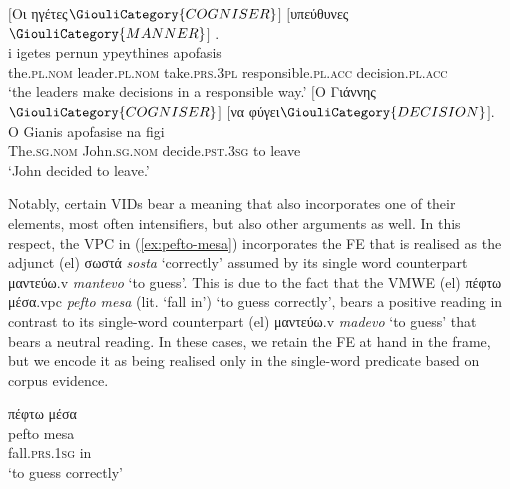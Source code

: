 \documentclass[output=paper,colorlinks,citecolor=brown]{langscibook}
\begin{document}
\ea
\label{ex:perno-apofasi}
\glll
$[$Οι ηγέτες$\GiouliCategory{COGNISER}$$]$ {} $[$υπεύθυνες$\GiouliCategory{MANNER}$$]$ {}. \\
i igetes pernun ypeythines apofasis \\
the.\textsc{pl.nom} leader.\textsc{pl.nom} take.\textsc{prs.3pl} responsible.\textsc{pl.acc} decision.\textsc{pl.acc} \\
\glt ‘the leaders make decisions in a responsible way.'
\ex
\label{ex:apofasizo}
\glll
$[$Ο Γιάννης$\GiouliCategory{COGNISER}$$]$  $[$να φύγει$\GiouliCategory{DECISION}$$]$. \\
O Gianis apofasise na figi \\
The.\textsc{sg.nom} John.\textsc{sg.nom} decide.\textsc{pst.3sg} to leave \\
\glt ‘John decided to leave.'
\z


Notably, certain VIDs bear a meaning that also incorporates one of their elements, most often intensifiers, but also other arguments as well. In this respect, the VPC in (\ref{ex:pefto-mesa}) incorporates the FE  that is realised as the adjunct (el) σωστά \textit{sosta} ‘correctly' assumed by its single word counterpart {μαντεύω}.v \textit{mantevo} ‘to guess'. This is due to the fact that the VMWE (el) {{πέφτω}} {{μέσα}}.vpc \textit{pefto mesa} (lit. `fall in') ‘to guess correctly', bears a positive reading in contrast to its single-word counterpart (el) {μαντεύω}.v \textit{madevo} ‘to guess' that bears a neutral reading. In these cases, we retain the FE at hand in the frame, but we encode it as being realised only in the single-word predicate based on corpus evidence.

\ea
\label{ex:pefto-mesa}
\glll
πέφτω μέσα \\
pefto 		mesa \\
fall.\textsc{prs.1sg}	in \\
\glt ‘to guess correctly'
\z
\end{document}
